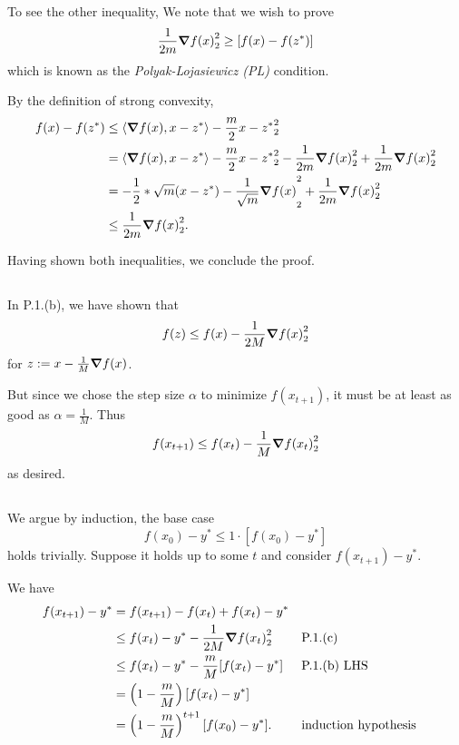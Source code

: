 \documentclass[10pt]{article}
\DeclarePairedDelimiter{\iprod}{\langle}{\rangle}
\let\norm\relax
\DeclarePairedDelimiter{\norm}{\lVert}{\rVert}
\begin{document}
To see the other inequality,
We note that we wish to prove
\[
  \frac1{2m} \norm{\grad f(x)}_2^2
  \geq [f(x) - f(z^*)]
\]
which is known as the \emph{Polyak-Lojasiewicz (PL)} condition.

By the definition of strong convexity,
\begin{align*}
  f(x) - f(z^*)
  &\leq \iprod{\grad f(x), x-z^*} - \frac{m}2 \norm{x-z^*}_2^2 \\
  &= \iprod{\grad f(x), x-z^*} - \frac{m}2 \norm{x-z^*}_2^2 - \frac1{2m} \norm{\grad f(x)}_2^2 + \frac1{2m} \norm{\grad f(x)}_2^2 \\
  &= -\frac12 \norm*{\sqrt m (x-z^*) - \frac1{\sqrt m} \grad f(x)}_2^2 + \frac1{2m} \norm{\grad f(x)}_2^2 \\
  &\leq \frac1{2m} \norm{\grad f(x)}_2^2.
\end{align*}

Having shown both inequalities,
we conclude the proof.

\subsection{}
In P.1.(b),
we have shown that
\[
  f(z) \leq f(x) - \frac1{2M} \norm{\grad f(x)}_2^2
\]
for $z := x - \frac1M \grad f(x)$.

But since we chose the step size $\alpha$ to minimize $f(x_{t+1})$,
it must be at least as good as $\alpha = \frac1M$.
Thus
\[
  f(x_{t+1})\leq f(x_t) - \frac1M \norm{\grad f(x_t)}_2^2
\]
as desired.

\subsection{}
We argue by induction,
the base case
\[
  f(x_0) - y^* \leq 1\cdot [f(x_0) - y^*]
\]
holds trivially.
Suppose it holds up to some $t$
and consider $f(x_{t+1}) - y^*$.

We have
\begin{align*}
  f(x_{t+1}) - y^*
  &= f(x_{t+1}) - f(x_t) + f(x_t) - y^* \\
  &\leq f(x_t) - y^* - \frac1{2M} \norm{\grad f(x_t)}_2^2 &&\text{P.1.(c)} \\
  &\leq f(x_t) - y^* - \frac{m}M [f(x_t) - y^*] &&\text{P.1.(b) LHS} \\
  &= \left( 1-\frac{m}M \right) [f(x_t) - y^*] \\
  &= \left( 1-\frac{m}M \right)^{t+1} [f(x_0) - y^*]. &&\text{induction hypothesis}
\end{align*}
\end{document}
